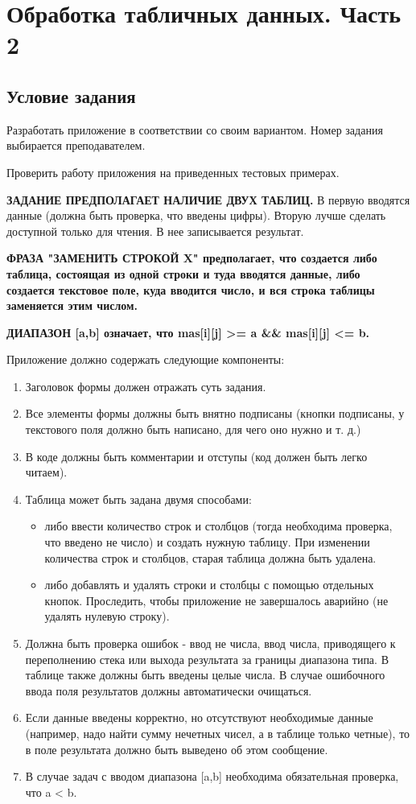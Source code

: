 \section{Обработка табличных данных. Часть 2 }

\subsection{Условие задания}
Разработать приложение в соответствии со своим вариантом. Номер задания выбирается преподавателем.

Проверить работу приложения на приведенных тестовых примерах.

\textbf{ЗАДАНИЕ ПРЕДПОЛАГАЕТ НАЛИЧИЕ ДВУХ ТАБЛИЦ.} В  первую вводятся данные (должна быть проверка, что введены цифры). Вторую лучше сделать доступной только для чтения. В нее записывается результат. 

\textbf{ФРАЗА "ЗАМЕНИТЬ СТРОКОЙ X"  предполагает, что создается либо таблица, состоящая из одной строки и туда вводятся данные, либо создается текстовое поле, куда вводится число, и вся строка таблицы заменяется этим числом.}

\textbf{ДИАПАЗОН [a,b] означает, что mas[i][j] >= a \&\& mas[i][j] <= b.}

Приложение должно содержать следующие компоненты:
\begin{enumerate}
    \item Заголовок формы должен отражать суть задания.
    \item Все элементы формы должны быть внятно подписаны (кнопки подписаны, у текстового поля должно быть написано, для чего оно нужно и т. д.)
    \item В коде должны быть комментарии и отступы (код должен быть легко читаем).
    \item  Таблица может быть задана двумя способами: 
    \begin{itemize}
        \item либо ввести количество строк и столбцов (тогда необходима проверка, что введено не число) и создать нужную таблицу. При изменении количества строк и столбцов, старая таблица должна быть удалена.
        \item либо добавлять и удалять строки и столбцы с помощью отдельных кнопок. Проследить, чтобы приложение не завершалось аварийно (не удалять нулевую строку).
    \end{itemize}
    \item  Должна быть проверка ошибок - ввод не числа, ввод числа, приводящего к переполнению стека или выхода результата за границы диапазона типа. В таблице также должны быть введены целые числа. В случае ошибочного ввода поля результатов должны автоматически очищаться.
    \item Если данные введены корректно, но отсутствуют необходимые данные (например, надо найти сумму нечетных чисел, а в таблице только четные), то в поле результата должно быть выведено об этом сообщение.
    \item В случае задач с вводом диапазона [a,b] необходима обязательная проверка, что a < b.
\end{enumerate}

